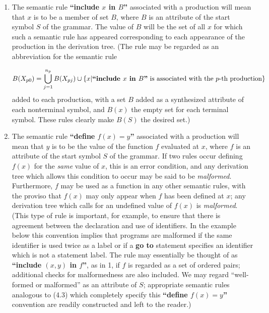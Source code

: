 \documentclass[a4paper]{article}
\begin{document}
\begin{enumerate}

\item The semantic rule {\bfseries ``include $x$ in $B$''} associated with a
production will mean that $x$ is to be a member of set $B$, where $B$ is an
attribute of the start symbol $S$ of the grammar. The value of $B$ will be the
set of all $x$ for which such a semantic rule has appeared corresponding to each
appearance of the production in the derivation tree. (The rule may be regarded
as an abbreviation for the semantic rule

\begin{equation}
	B(X_{p0}) = \bigcup_{j=1}^{n_p} B(X_{pj}) \cup
		\{x| \mbox{{\bfseries ``include }} x {\mbox {\bfseries\ in }}
		B\mbox{{\bfseries ''} is associated with the } p \mbox{-th production}\}
\end{equation}
added to each production, with a set $B$ added as a synthesized attribute of
each nonterminal symbol, and $B(x)$ the empty set for each terminal symbol.
These rules clearly make $B(S)$ the desired set.)

\item The semantic rule {\bfseries ``define $f(x) = y$''} associated with a
production will mean that $y$ is to be the value of the function $f$ evaluated
at $x$, where $f$ is an attribute of the start symbol $S$ of the grammar. If
two rules occur defining $f(x)$ for the \emph{same} value of $x$, this is an
error condition, and any derivation tree which allows this condition to occur
may be said to be \emph{malformed}. Furthermore, $f$ may be used as a function
in any other semantic rules, with the proviso that $f(x)$ may only appear when
$f$ has been defined at $x$; any derivation tree which calls for an undefined
value of $f(x)$ is \emph{malformed}. (This type of rule is important, for
example, to ensure that there is agreement between the declaration and use of
identifiers. In the example below this convention implies that programs are
malformed if the same identifier is used twice as a label or if a {\bfseries go
to} statement specifies an identifier which is not a statement label. The rule
may essentially be thought of as {\bfseries ``include $(x, y)$ in $f$''}, as in
1, if $f$ is regarded as a set of ordered pairs; additional checks for
malformedness are also included. We may regard ``well-formed or malformed'' as
an attribute of $S$; appropriate semantic rules analogous to (4.3) which
completely specify this {\bfseries ``define $f(x) = y$''} convention are
readily constructed and left to the reader.)


\end{enumerate}
\end{document}
